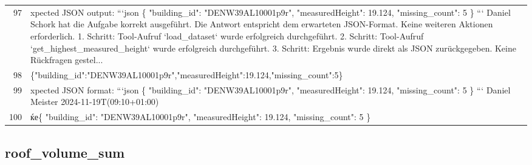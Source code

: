 \documentclass[a4paper,11pt]{article}
\begin{document}
\begin{table}[ht]
\begin{tabular}{r p{12cm}}
97 & xpected JSON output:
```json
\{
  "building\_id": "DENW39AL10001p9r",
  "measuredHeight": 19.124,
  "missing\_count": 5
\}
``` Daniel Schork hat die Aufgabe korrekt ausgeführt. Die Antwort entspricht dem erwarteten JSON-Format. Keine weiteren Aktionen erforderlich. 1. Schritt: Tool-Aufruf `load\_dataset` wurde erfolgreich durchgeführt.
2. Schritt: Tool-Aufruf `get\_highest\_measured\_height` wurde erfolgreich durchgeführt.
3. Schritt: Ergebnis wurde direkt als JSON zurückgegeben. Keine Rückfragen gestel... \\
98 & \{"building\_id":"DENW39AL10001p9r","measuredHeight":19.124,"missing\_count":5\} \\
99 & xpected JSON format:
```json
\{
  "building\_id": "DENW39AL10001p9r",
  "measuredHeight": 19.124,
  "missing\_count": 5
\}
``` Daniel Meister 2024-11-19T(09:10+01:00) \\
100 & ќе\{
  "building\_id": "DENW39AL10001p9r",
  "measuredHeight": 19.124,
  "missing\_count": 5
\} \\
\hline
\end{tabular}
\end{table}

\clearpage
\subsection{roof\_volume\_sum}
\end{document}
